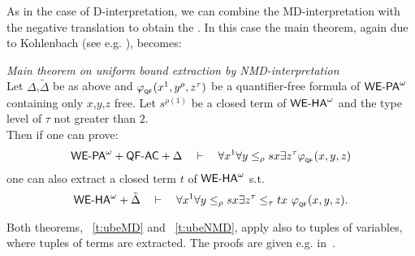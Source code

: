As in the case of D-interpretation, we can combine the MD-interpretation with
the negative translation to obtain the . In this case
the main theorem, again due to Kohlenbach (see e.g. \cite{Kohlenbach08}), becomes:
\begin{thm}{\em Main theorem on uniform bound extraction by NMD-interpretation \cite{Kohlenbach08}\\}
\label{t:ubeNMD}
Let $\Delta$,$\tilde\Delta$ be as above and $\varphi_{{}_{\textsf{\upshape QF}}}(x^1,y^\rho,z^\tau)$ be a 
quantifier-free formula of ${\textsf{\upshape WE-PA}}^{\omega}$ containing only $x$,$y$,$z$ free. 
Let $s^{\rho(1)}$ be a closed
term of ${\textsf{\upshape WE-HA}}^{\omega}$ and the type level of $\tau$ not greater than $2$.\\
Then if one can prove:
\[
{\textsf{\upshape WE-PA}}^{\omega}+\textsf{\upshape QF-}\textsf{\upshape AC}+\Delta\quad\vdash\quad
  \forall x^1\forall y\leq_\rho sx\exists z^\tau \varphi_{{}_{\textsf{\upshape QF}}}(x,y,z)
\]
one can also extract a closed term $t$ of ${\textsf{\upshape WE-HA}}^{\omega}$ s.t.
\[
\weha+\tilde\Delta\quad\proves\quad
  \forall x^1\forall y\leq_\rho sx\exists z^\tau\leq_\tau tx\ \phi_{{}_{\QF}}(x,y,z)\text{.}
\]
\end{thm}
Both theorems, ~\ref{t:ubeMD} and ~\ref{t:ubeNMD}, apply also to tuples of variables, 
where tuples of terms are extracted. The proofs are given e.g. in~\cite{Kohlenbach08}.
%
%
